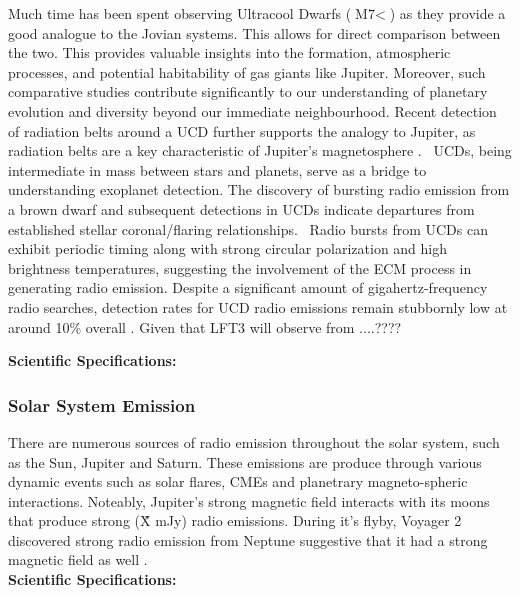Much time has been spent observing Ultracool Dwarfs ($\text{M7} <$) as they provide a good analogue to the Jovian systems. This allows for direct comparison between the two.  This provides valuable insights into the formation, atmospheric processes, and potential habitability of gas giants like Jupiter. Moreover, such comparative studies contribute significantly to our understanding of planetary evolution and diversity beyond our immediate neighbourhood. Recent detection of radiation belts around a UCD further supports the analogy to Jupiter, as radiation belts are a key characteristic of Jupiter's magnetosphere \citep{joe_nature_review}. \ UCDs, being intermediate in mass between stars and planets, serve as a bridge to understanding exoplanet detection. The discovery of bursting radio emission from a brown dwarf and subsequent detections in UCDs indicate departures from established stellar coronal/flaring relationships. \ Radio bursts from UCDs can exhibit periodic timing \citep{hallinan_rotational_2006} along with strong circular polarization and high brightness temperatures, suggesting the involvement of the ECM process in generating radio emission. Despite a significant amount of gigahertz-frequency radio searches, detection rates for UCD radio emissions remain stubbornly low at around 10\% overall \citep{lynch_radio_2016}. Given that LFT3 will observe from ....????

\textbf{Scientific Specifications:}

\subsubsection{Solar System Emission} 

There are numerous sources of radio emission throughout the solar system, such as the Sun, Jupiter and Saturn. These emissions are produce through various dynamic events such as solar flares, CMEs and planetrary magneto-spheric interactions. Noteably, Jupiter's strong magnetic field interacts with its moons that produce strong (\~ X mJy) radio emissions. During it's flyby, Voyager 2 discovered strong radio emission from Neptune suggestive that it had a strong magnetic field as well \citep{ZHANG199237}.\\ 
\textbf{Scientific Specifications:}

